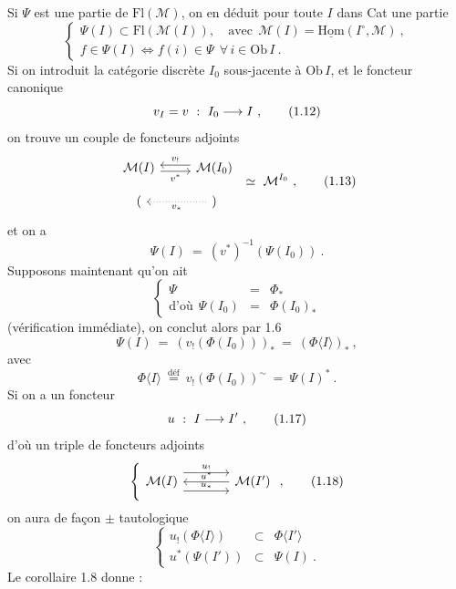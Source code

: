Si $\Psi$ est une partie de $\mathrm{Fl}(\mathcal{M})$, on en déduit pour toute $I$ dans Cat une partie
\[
\left\{
\begin{array}{l}
\Psi(I) \subset \mathrm{Fl}(\mathcal{M}(I)), \quad \text{avec}\ \ \mathcal{M}(I) = \underline{\mathrm{Hom}}(I^{\circ}, \mathcal{M})\ , \\[1ex]
f \in \Psi(I) \iff f(i) \in \Psi \ \ \forall\, i \in \mathrm{Ob}\, I\ .
\end{array}
\right.
\tag*{(1.11)}
\]
Si on introduit la catégorie discrète $I_0$ sous-jacente à $\mathrm{Ob}\, I$, et le foncteur canonique
\[
v_I = v \ :\ I_0 \longrightarrow I\ , \tag*{(1.12)}
\]
on trouve un couple de foncteurs adjoints
\[
\begin{tikzcd}[row sep=small]
\mathcal{M}(I) \arrow[r, shift right=1, "v^{*}"'] & \mathcal{M}(I_0) \arrow[l, shift right=1, "v_{!}"'] \\
( & ) \arrow[l, dotted, "v_{*}"]
\end{tikzcd}
\ \simeq\ \mathcal{M}^{I_0}\ ,
\tag*{(1.13)}
\]
et on a
\[
\Psi(I) \ =\ (v^{*})^{-1}(\Psi(I_0))\ .
\]
Supposons maintenant qu'on ait
\[
\left\{
\begin{array}{rcl}
\Psi & = & \Phi_{*} \\[1ex]
\text{d'où}\ \ \Psi(I_0) & = & \Phi(I_0)_{*}
\end{array}
\right.
\tag*{(1.14)}
\]
(vérification immédiate), on conclut alors par 1.6
\[
\Psi(I) \ =\ (v_{!}(\Phi(I_0)))_{*} \ =\ (\Phi\langle I\rangle)_{*}\ , \tag*{(1.15)}
\]
avec
\[
\Phi\langle I\rangle \ \overset{\text{déf}}{=}\ v_{!}(\Phi(I_0))^{\sim} \ =\ \Psi(I)^{*}\ . \tag*{(1.16)}
\]
Si on a un foncteur
\[
u \ :\ I \longrightarrow I'\ , \tag*{(1.17)}
\]
d'où un triple de foncteurs adjoints
\[
\left\{
\begin{tikzcd}[column sep=large]
\mathcal{M}(I) \arrow[r, shift left=3, "u_{!}"] \arrow[r, shift right=3, "u_{*}"] & \mathcal{M}(I') \arrow[l, "u^{*}"']
\end{tikzcd}
\right.
,
\tag*{(1.18)}
\]
on aura de façon $\pm$ tautologique
\[
\left\{
\begin{array}{rcl}
u_{!}(\Phi\langle I\rangle) & \subset & \Phi\langle I'\rangle \\
u^{*}(\Psi(I')) & \subset & \Psi(I)\ .
\end{array}
\right.
\tag*{(1.19)}
\]
Le corollaire 1.8 donne :

